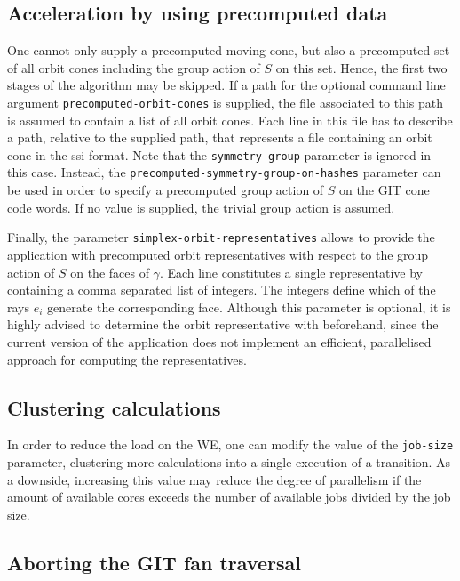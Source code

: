 \subsection*{Acceleration by using precomputed data}

One cannot only supply a precomputed moving cone, but also a precomputed set of all orbit cones including the group action of $S$ on this set. Hence, the first two stages of the algorithm may be skipped. If a path for the optional command line argument \texttt{precomputed-orbit-cones} is supplied, the file associated to this path is assumed to contain a list of all orbit cones. Each line in this file has to describe a path, relative to the supplied path, that represents a file containing an orbit cone in the \ac{ssi} format. Note that the \texttt{symmetry-group} parameter is ignored in this case. Instead, the \texttt{precomputed-symmetry-group-on-hashes} parameter can be used in order to specify a precomputed group action of $S$ on the GIT cone code words. If no value is supplied, the trivial group action is assumed.

Finally, the parameter \texttt{simplex-orbit-representatives} allows to provide the application with precomputed orbit representatives with respect to the group action of $S$ on the faces of $\gamma$. Each line constitutes a single representative by containing a comma separated list of integers. The integers define which of the rays $e_i$ generate the corresponding face. Although this parameter is optional, it is highly advised to determine the orbit representative with \gap{} \cite{gap} beforehand, since the current version of the application does not implement an efficient, parallelised approach for computing the representatives.

\subsection*{Clustering calculations}

In order to reduce the load on the \ac{WE}, one can modify the value of the \texttt{job-size} parameter, clustering more calculations into a single execution of a transition. As a downside, increasing this value may reduce the degree of parallelism if the amount of available cores exceeds the number of available jobs divided by the job size.

\subsection*{Aborting the GIT fan traversal}

